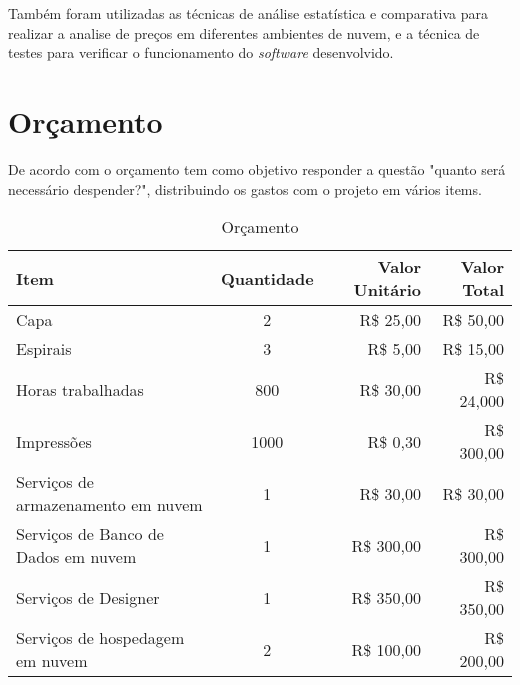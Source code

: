 Também foram utilizadas as técnicas de análise estatística
e comparativa para realizar a analise de preços em diferentes
ambientes de nuvem, e a técnica de testes para verificar
o funcionamento do \emph{software} desenvolvido.

\section{Orçamento} \label{sec:budget}

De acordo com \citep[p. 128]{LAKATOS2021:metodologia} o orçamento
tem como objetivo responder a questão "quanto será necessário
despender?", distribuindo os gastos com o projeto em vários items.

\begin{table}[H]
    \caption{Orçamento}
    \begin{tabular}{|p{6.4cm}|c|r|r|}
        \hline
        {\textbf{Item}}                         & {\textbf{Quantidade}} & {\textbf{Valor Unitário}} & {\textbf{Valor Total}} \\ \hline
        {{Capa}}                                & {2}                   & {R\$ 25,00 }              & {R\$ 50,00}            \\ \hline
        {{Espirais}}                            & {3}                   & {R\$ 5,00 }               & {R\$ 15,00}            \\ \hline
        {{Horas trabalhadas}}                   & {800}                 & {R\$ 30,00 }              & {R\$ 24,000}           \\ \hline
        {{Impressões}}                          & {1000}                & {R\$ 0,30 }               & {R\$ 300,00}           \\ \hline
        {{Serviços de armazenamento em nuvem}}  & {1}                   & {R\$ 30,00 }              & {R\$ 30,00}            \\ \hline
        {{Serviços de Banco de Dados em nuvem}} & {1}                   & {R\$ 300,00 }             & {R\$ 300,00}           \\ \hline
        {{Serviços de Designer}}                & {1}                   & {R\$ 350,00 }             & {R\$ 350,00}           \\ \hline
        {{Serviços de hospedagem em nuvem}}     & {2}                   & {R\$ 100,00 }             & {R\$ 200,00}           \\ \hline
    \end{tabular}
\end{table}

